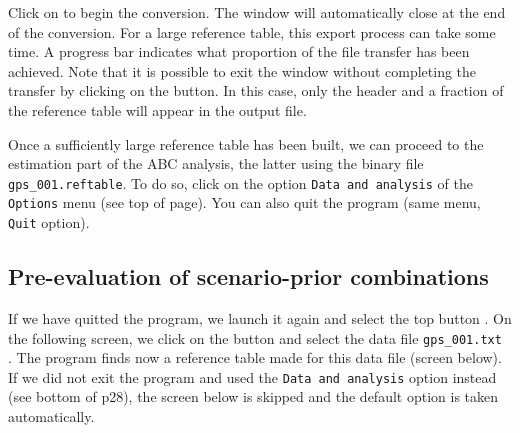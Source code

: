 
Click on  to begin the conversion. The window will automatically close at the end of the conversion. For a large reference table, this export process can take some time. A progress bar indicates what proportion of the file transfer has been achieved. Note that it is possible to exit the window without completing the transfer by clicking on the  button. In this case, only the header and a fraction of the reference table will appear in the output file.



Once a sufficiently large reference table has been built, we can proceed to the estimation part of the ABC analysis, the latter using the binary file \texttt{gps\_001.reftable}. To do so, click on the option \texttt{Data and analysis} of the \texttt{Options} menu (see top of page). You can also quit the program (same menu, \texttt{Quit} option).

\newpage
\subsection{Pre-evaluation of scenario-prior combinations}

If we have quitted the program, we launch it again and select the top button . On the following screen, we click on the  button and select the data file \texttt{gps\_001.txt }. The program finds now a reference table made for this data file (screen below). If we did not exit the program and used the  \texttt{Data and analysis}  option instead (see bottom of p28), the screen below is skipped and the default option is taken automatically.


